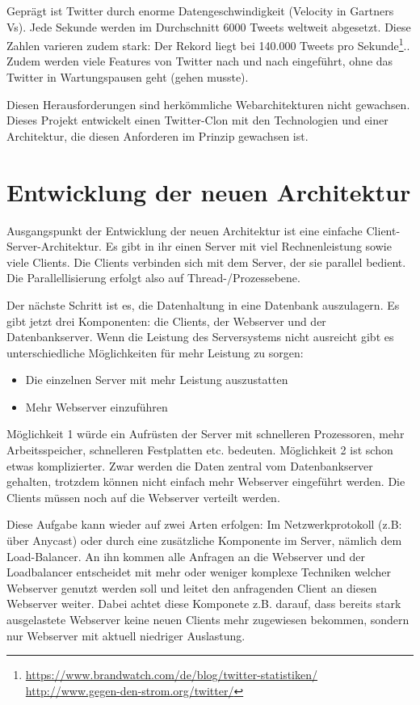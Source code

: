 \begin{itemize}
Geprägt ist Twitter durch enorme Datengeschwindigkeit (Velocity in Gartners Vs). Jede Sekunde werden im
Durchschnitt 6000 Tweets weltweit abgesetzt. Diese Zahlen varieren zudem
stark: Der Rekord liegt bei 140.000 Tweets pro Sekunde\footnote{\url{https://www.brandwatch.com/de/blog/twitter-statistiken/}
\url{http://www.gegen-den-strom.org/twitter/}}.. Zudem werden viele Features von Twitter nach und nach eingeführt,
ohne das Twitter in Wartungspausen geht (gehen musste).

Diesen Herausforderungen sind herkömmliche Webarchitekturen nicht gewachsen. Dieses Projekt entwickelt einen Twitter-Clon
mit den Technologien und einer Architektur, die diesen Anforderen im Prinzip gewachsen ist.

\section{Entwicklung der neuen Architektur}
Ausgangspunkt der Entwicklung der neuen Architektur ist eine einfache Client-Server-Architektur. Es gibt in ihr einen Server
mit viel Rechnenleistung sowie viele Clients. Die Clients verbinden sich mit dem Server, der sie parallel bedient. Die Parallellisierung
erfolgt also auf Thread-/Prozessebene.

Der nächste Schritt ist es, die Datenhaltung in eine Datenbank auszulagern. Es gibt jetzt drei Komponenten: die Clients,
der Webserver und der Datenbankserver. Wenn die Leistung des Serversystems nicht ausreicht gibt es unterschiedliche Möglichkeiten
für mehr Leistung zu sorgen:
\begin{itemize}
  \item Die einzelnen Server mit mehr Leistung auszustatten
  \item Mehr Webserver einzuführen
\end{itemize}
Möglichkeit 1 würde ein Aufrüsten der Server mit schnelleren Prozessoren, mehr Arbeitsspeicher, schnelleren Festplatten etc.
bedeuten. Möglichkeit 2 ist schon etwas komplizierter. Zwar werden die Daten zentral vom Datenbankserver gehalten,
trotzdem können nicht einfach mehr Webserver eingeführt werden. Die Clients müssen noch auf die Webserver verteilt werden.

Diese Aufgabe kann wieder auf zwei Arten erfolgen: Im Netzwerkprotokoll (z.B: über Anycast) oder durch eine zusätzliche
Komponente im Server, nämlich dem Load-Balancer. An ihn kommen alle Anfragen an die Webserver und der Loadbalancer
entscheidet mit mehr oder weniger komplexe Techniken welcher Webserver genutzt werden soll und leitet
den anfragenden Client an diesen Webserver weiter. Dabei achtet diese Komponete z.B. darauf, dass bereits stark
ausgelastete Webserver keine neuen Clients mehr zugewiesen bekommen, sondern nur Webserver mit aktuell
niedriger Auslastung.


\end{itemize}
